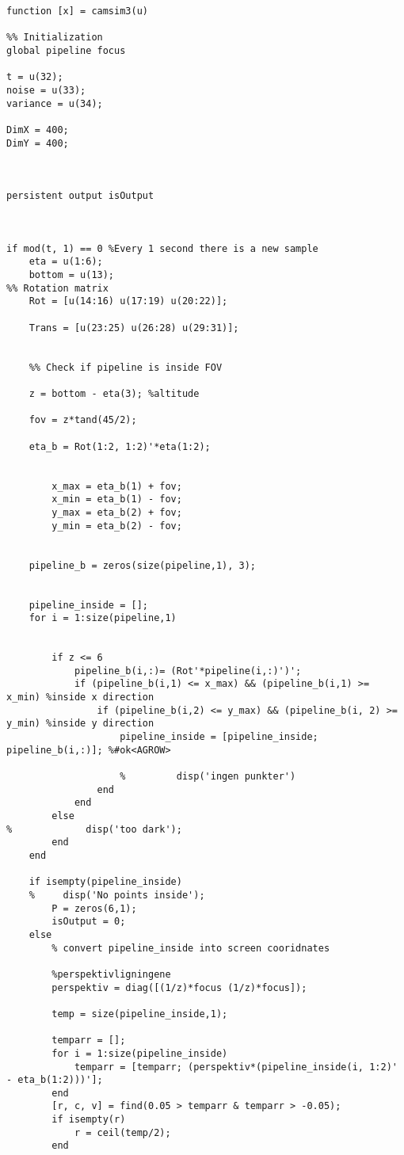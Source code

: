 \begin{lstlisting}
function [x] = camsim3(u)

%% Initialization
global pipeline focus

t = u(32);
noise = u(33);
variance = u(34);

DimX = 400;
DimY = 400;



persistent output isOutput



if mod(t, 1) == 0 %Every 1 second there is a new sample
    eta = u(1:6);
    bottom = u(13);
%% Rotation matrix
    Rot = [u(14:16) u(17:19) u(20:22)];

    Trans = [u(23:25) u(26:28) u(29:31)];


    %% Check if pipeline is inside FOV

    z = bottom - eta(3); %altitude

    fov = z*tand(45/2);

    eta_b = Rot(1:2, 1:2)'*eta(1:2);


        x_max = eta_b(1) + fov;
        x_min = eta_b(1) - fov;
        y_max = eta_b(2) + fov;
        y_min = eta_b(2) - fov;


    pipeline_b = zeros(size(pipeline,1), 3);


    pipeline_inside = [];
    for i = 1:size(pipeline,1)

        
        if z <= 6
            pipeline_b(i,:)= (Rot'*pipeline(i,:)')';
            if (pipeline_b(i,1) <= x_max) && (pipeline_b(i,1) >= x_min) %inside x direction
                if (pipeline_b(i,2) <= y_max) && (pipeline_b(i, 2) >= y_min) %inside y direction
                    pipeline_inside = [pipeline_inside; pipeline_b(i,:)]; %#ok<AGROW>

                    %         disp('ingen punkter')
                end
            end
        else
%             disp('too dark');
        end
    end

    if isempty(pipeline_inside)
    %     disp('No points inside');
        P = zeros(6,1);
        isOutput = 0;
    else
        % convert pipeline_inside into screen cooridnates
        
        %perspektivligningene
        perspektiv = diag([(1/z)*focus (1/z)*focus]);
        
        temp = size(pipeline_inside,1);

        temparr = [];
        for i = 1:size(pipeline_inside)
            temparr = [temparr; (perspektiv*(pipeline_inside(i, 1:2)' - eta_b(1:2)))'];
        end
        [r, c, v] = find(0.05 > temparr & temparr > -0.05);
        if isempty(r)
            r = ceil(temp/2);
        end
        

\end{lstlisting}
